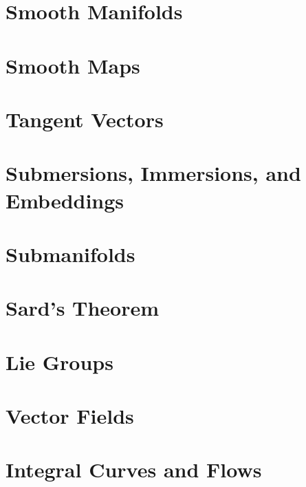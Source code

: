 

\chapter{Smooth Manifolds}
\label{chap:smooth-manifolds}


\chapter{Smooth Maps}
\label{chap:smooth-maps}


\chapter{Tangent Vectors}
\label{chap:tangent-vectors}


\chapter{Submersions, Immersions, and Embeddings}
\label{chap:submersions-immersions-embeddings}


\chapter{Submanifolds}
\label{chap:submanifolds}


\chapter{Sard's Theorem}
\label{chap:sards-theorem}


\chapter{Lie Groups}
\label{chap:lie-groups}


\chapter{Vector Fields}
\label{chap:vector-fields}


\chapter{Integral Curves and Flows}
\label{chap:integral-curves-and-flows}


